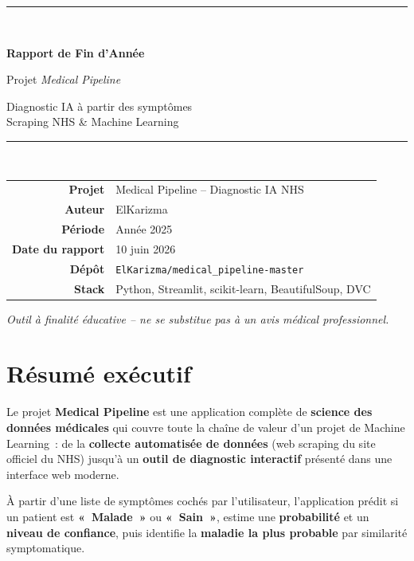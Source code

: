 \documentclass[11pt,a4paper]{article}
\begin{document}
\begin{titlepage}
\centering
\vspace*{2cm}

{\color{primary}\rule{\linewidth}{2pt}}\\[0.6cm]
{\Huge\bfseries Rapport de Fin d'Année\par}
\vspace{0.5cm}
{\LARGE Projet \textit{Medical Pipeline}\par}
\vspace{0.3cm}
{\large Diagnostic IA à partir des symptômes\\ Scraping NHS \& Machine Learning\par}
{\color{primary}\rule{\linewidth}{2pt}}\\[1.5cm]

\begin{tabular}{rl}
\textbf{Projet} & Medical Pipeline -- Diagnostic IA NHS \\[4pt]
\textbf{Auteur} & ElKarizma \\[4pt]
\textbf{Période} & Année 2025 \\[4pt]
\textbf{Date du rapport} & 10 juin 2026 \\[4pt]
\textbf{Dépôt} & \texttt{ElKarizma/medical\_pipeline-master} \\[4pt]
\textbf{Stack} & Python, Streamlit, scikit-learn, BeautifulSoup, DVC \\
\end{tabular}

\vfill
{\small\itshape Outil à finalité éducative -- ne se substitue pas à un avis médical professionnel.\par}
\end{titlepage}

\tableofcontents
\newpage

\section{Résumé exécutif}

Le projet \textbf{Medical Pipeline} est une application complète de \textbf{science des données médicales} qui couvre toute la chaîne de valeur d'un projet de Machine Learning~: de la \textbf{collecte automatisée de données} (web scraping du site officiel du NHS) jusqu'à un \textbf{outil de diagnostic interactif} présenté dans une interface web moderne.

À partir d'une liste de symptômes cochés par l'utilisateur, l'application prédit si un patient est \textbf{«~Malade~»} ou \textbf{«~Sain~»}, estime une \textbf{probabilité} et un \textbf{niveau de confiance}, puis identifie la \textbf{maladie la plus probable} par similarité symptomatique.
\end{document}
